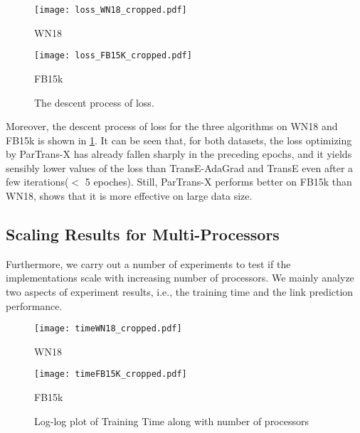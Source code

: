 \documentclass[sigconf]{acmart}
\begin{document}
\begin{figure}[htbp]
\begin{minipage}[t]{0.45\linewidth}
\centering
\texttt{[image: loss\_WN18\_cropped.pdf]}
\vspace{-20pt}
\caption*{WN18}
\vspace{-5pt}
\end{minipage}
\begin{minipage}[t]{0.45\linewidth}
\centering
\texttt{[image: loss\_FB15K\_cropped.pdf]}
\vspace{-20pt}
\caption*{FB15k}
\vspace{-5pt}
\end{minipage}
\caption{The descent process of loss.}
\label{losses1}
\vspace{-10pt}
\end{figure}

Moreover, the descent process of loss for the three algorithms on WN18  and  FB15k is shown in \figurename \ref{losses1}.  It can be seen that, for both datasets, the loss optimizing by ParTrans-X has already  fallen sharply  in the preceding epochs, and it yields sensibly lower values of the loss than TransE-AdaGrad and TransE even after a few iterations($<$ 5 epoches). 
 Still, ParTrans-X performs better on FB15k than WN18, shows that it is more effective on large data size.





\subsection{Scaling Results for Multi-Processors}




Furthermore, we carry out a number of experiments to test if the implementations scale with increasing number of processors. We mainly analyze two aspects of experiment results, i.e., the training time and the link prediction performance. 




\begin{figure}[htbp]
\begin{minipage}[t]{0.45\linewidth}
\centering
\texttt{[image: timeWN18\_cropped.pdf]}
\vspace{-15pt}
\caption*{WN18}
\end{minipage}
\begin{minipage}[t]{0.45\linewidth}
\centering
\texttt{[image: timeFB15K\_cropped.pdf]}
\vspace{-15pt}
\caption*{FB15k}
\end{minipage}
\vspace{-7pt}
\caption{Log-log plot of Training Time along with number of processors}
\label{traintime}
\vspace{-10pt}
\end{figure}
\end{document}
